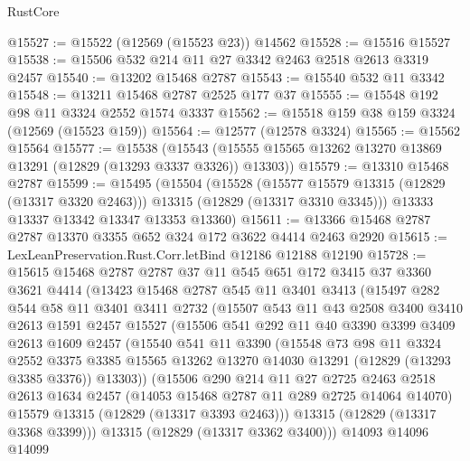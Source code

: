 \begin{lexlean}{RustCore}
\begin{coremodule}
@15527 := @15522 (@12569 (@15523 @23)) @14562
@15528 := @15516 @15527
@15538 := @15506 @532 @214 @11 @27 @3342 @2463 @2518 @2613 @3319 @2457
@15540 := @13202 @15468 @2787
@15543 := @15540 @532 @11 @3342
@15548 := @13211 @15468 @2787 @2525 @177 @37
@15555 := @15548 @192 @98 @11 @3324 @2552 @1574 @3337
@15562 := @15518 @159 @38 @159 @3324 (@12569 (@15523 @159))
@15564 := @12577 (@12578 @3324)
@15565 := @15562 @15564
@15577 := @15538
    (@15543 (@15555 @15565 @13262 @13270 @13869 @13291 (@12829 (@13293 @3337 @3326)) @13303))
@15579 := @13310 @15468 @2787
@15599 := @15495
    (@15504
      (@15528
        (@15577 @15579 @13315 (@12829 (@13317 @3320 @2463)))
        @13315
        (@12829 (@13317 @3310 @3345)))
      @13333
      @13337
      @13342
      @13347
      @13353
      @13360)
@15611 := @13366 @15468 @2787 @2787 @13370 @3355 @652 @324 @172 @3622 @4414 @2463 @2920
@15615 := LexLeanPreservation.Rust.Corr.letBind @12186 @12188 @12190
@15728 := @15615
    @15468
    @2787
    @2787
    @37
    @11
    @545
    @651
    @172
    @3415
    @37
    @3360
    @3621
    @4414
    (@13423
      @15468
      @2787
      @545
      @11
      @3401
      @3413
      (@15497
        @282
        @544
        @58
        @11
        @3401
        @3411
        @2732
        (@15507
          @543
          @11
          @43
          @2508
          @3400
          @3410
          @2613
          @1591
          @2457
          @15527
          (@15506
            @541
            @292
            @11
            @40
            @3390
            @3399
            @3409
            @2613
            @1609
            @2457
            (@15540
              @541
              @11
              @3390
              (@15548
                @73
                @98
                @11
                @3324
                @2552
                @3375
                @3385
                @15565
                @13262
                @13270
                @14030
                @13291
                (@12829 (@13293 @3385 @3376))
                @13303))
            (@15506
              @290
              @214
              @11
              @27
              @2725
              @2463
              @2518
              @2613
              @1634
              @2457
              (@14053 @15468 @2787 @11 @289 @2725 @14064 @14070)
              @15579
              @13315
              (@12829 (@13317 @3393 @2463)))
            @13315
            (@12829 (@13317 @3368 @3399)))
          @13315
          (@12829 (@13317 @3362 @3400)))
        @14093
        @14096
        @14099

\end{coremodule}
\end{lexlean}
